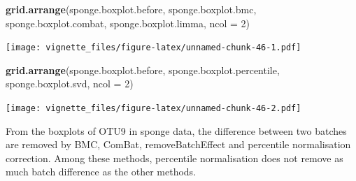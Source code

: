 \documentclass[]{book}
\newenvironment{Shaded}{\begin{snugshade}}{\end{snugshade}}
\newcommand{\KeywordTok}[1]{\textcolor[rgb]{0.13,0.29,0.53}{\textbf{#1}}}
\newcommand{\DataTypeTok}[1]{\textcolor[rgb]{0.13,0.29,0.53}{#1}}
\newcommand{\DecValTok}[1]{\textcolor[rgb]{0.00,0.00,0.81}{#1}}
\newcommand{\NormalTok}[1]{#1}
\begin{document}
\begin{Shaded}
\begin{Highlighting}[]
\KeywordTok{grid.arrange}\NormalTok{(sponge.boxplot.before, sponge.boxplot.bmc, }
\NormalTok{             sponge.boxplot.combat, sponge.boxplot.limma, }\DataTypeTok{ncol =} \DecValTok{2}\NormalTok{)}
\end{Highlighting}
\end{Shaded}

\texttt{[image: vignette\_files/figure-latex/unnamed-chunk-46-1.pdf]}

\begin{Shaded}
\begin{Highlighting}[]
\KeywordTok{grid.arrange}\NormalTok{(sponge.boxplot.before, sponge.boxplot.percentile, }
\NormalTok{             sponge.boxplot.svd, }\DataTypeTok{ncol =} \DecValTok{2}\NormalTok{)}
\end{Highlighting}
\end{Shaded}

\texttt{[image: vignette\_files/figure-latex/unnamed-chunk-46-2.pdf]}

From the boxplots of OTU9 in sponge data, the difference between two
batches are removed by BMC, ComBat, removeBatchEffect and percentile
normalisation correction. Among these methods, percentile normalisation
does not remove as much batch difference as the other methods.
\end{document}
